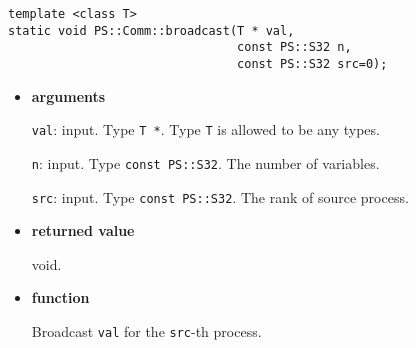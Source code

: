 
\begin{screen}
\begin{verbatim}
template <class T>
static void PS::Comm::broadcast(T * val,
                                const PS::S32 n,
                                const PS::S32 src=0);
\end{verbatim}
\end{screen}

\begin{itemize}

\item{\bf arguments}

{\tt val}: input. Type {\tt T *}. Type {\tt T} is allowed to be any
types.

{\tt n}: input. Type {\tt const PS::S32}. The number of variables.

{\tt src}: input. Type {\tt const PS::S32}. The rank of source
process.




\item{\bf returned value}

void.

\item{\bf function}

Broadcast {\tt val} for the {\tt src}-th process.


\end{itemize}

